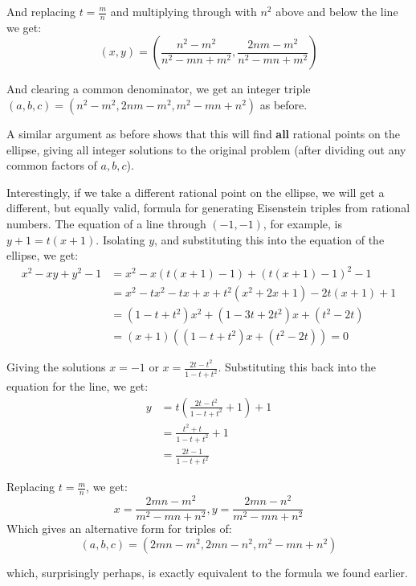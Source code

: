 \documentclass{article}
\begin{document}
And replacing $t = \frac{m}{n}$ and multiplying through with $n^2$ above and below the line we get:
\[(x,y) = \left(\frac{n^2-m^2}{n^2-mn+m^2}, \frac{2nm - m^2}{n^2-mn+ m^2}\right) \]

And clearing a common denominator, we get an integer triple
$(a,b,c) = (n^2 - m^2, 2nm - m^2, m^2 - mn + n^2)$ as before.

A similar argument as before shows that this will find \textbf{all} rational points on the
ellipse, giving all integer solutions to the original problem (after dividing out any common factors
of $a, b, c$).

Interestingly, if we take a different rational point on the ellipse, we will get a different, but
equally valid, formula for generating Eisenstein triples from rational numbers. The equation of
a line through $(-1,-1)$, for example, is $y + 1 = t(x + 1)$. Isolating $y$, and substituting this
into the equation of the ellipse, we get:
\begin{equation*}
        \begin{split}
		x^2 - xy + y^2 - 1 & = x^2 - x(t(x+1)-1) + (t(x+1)-1)^2 - 1\\
		& = x^2 -tx^2 -tx + x + t^2(x^2+2x+1)-2t(x+1)+1 \\
		& = (1 - t + t^2)x^2 + (1 - 3t + 2t^2)x + (t^2-2t) \\
		& = (x+1)((1 - t + t^2)x + (t^2-2t)) = 0
	\end{split}
\end{equation*}

Giving the solutions $x = -1$ or $x = \frac{2t-t^2}{1-t+t^2}$.
Substituting this back into the equation for the line, we get:
\begin{equation*} 
        \begin{split}
		y &= t\left(\frac{2t-t^2}{1-t+t^2} + 1\right) + 1 \\
		& = \frac{t^2 + t}{1-t+t^2} + 1 \\
		& = \frac{2t - 1}{1 - t + t^2}
	\end{split}
\end{equation*}

Replacing $t = \frac{m}{n}$, we get:
\[ x = \frac{2mn - m^2}{m^2 - mn + n^2}, y = \frac{2mn - n^2}{m^2 - mn + n^2} \]
Which gives an alternative form for triples of:
\[ (a,b,c) = (2mn - m^2, 2mn - n^2, m^2 -mn + n^2) \]

which, surprisingly perhaps, is exactly equivalent to the formula we found earlier.
\end{document}
